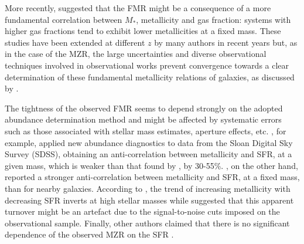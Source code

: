 \documentclass[useAMS,usenatbib]{mn2e}
\begin{document}
More recently, \citet{bothwell2013} suggested that the FMR might be a consequence of a 
more fundamental correlation between $M_*$, metallicity and gas fraction:
systems with higher gas fractions tend to exhibit lower metallicities at a fixed
mass.  These studies have been extended at different $z$ by many authors in recent years 
\citep[e.g.][]{cresci2012,hunt2012,henry2013,kacprzak2016,laralopez2013a,
stott2013,cullen2014,maier2014, nakajima2014, zahid2014a, bothwell2016} but,
as in the case of the MZR, the large uncertainties and diverse observational techniques
involved in observational works
prevent convergence towards a clear determination of these fundamental metallicity relations of galaxies,
as discussed by \citet[][]{telford2016}.

The tightness of the observed FMR seems to depend strongly on the adopted abundance determination method 
and might be affected by systematic errors such as those associated with stellar mass estimates, aperture effects, etc.
\citet{telford2016}, for example, applied new abundance diagnostics to data from the Sloan Digital Sky Survey
(SDSS), obtaining an anti-correlation between metallicity and SFR, at a given mass, which is weaker than that found
by \citet{mannucci2010}, by 30-55\%. 
\citet{andrews2013}, on the other hand, reported a stronger anti-correlation between
metallicity and SFR, at a fixed mass, than \citet{mannucci2010} for nearby galaxies. According to \citet{yates2011}, the
trend of increasing metallicity with decreasing SFR inverts at high stellar masses while
\citet{salim2014} suggested that this apparent turnover might be an artefact due to the
signal-to-noise cuts imposed on the observational sample. 
Finally, other authors claimed that there is no significant dependence of the observed MZR on
the SFR \citep[e.g.][]{hughes2013, sanchez2013, sanchez2017}.
\end{document}
